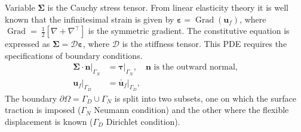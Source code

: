 \documentclass{svjour3}                     %
\DeclareMathOperator*{\Grad}{Grad}
\newcommand{\secondRev}[1]{\textcolor{blue!80!black}{#1}}
\begin{document}
\begin{itemize}
	Variable $\bm\Sigma$ is the Cauchy stress tensor. From linear elasticity theory it is well known that the infinitesimal \secondRev{strain} is given by $\bm\varepsilon = \Grad(\bm{u}_f)$, where $\Grad=~\frac{1}{2}[\nabla+\nabla^\top]$ is the symmetric gradient. The constitutive equation is expressed as $\bm\Sigma =  \bm{\mathcal{D}} \bm\varepsilon$, where $ \bm{\mathcal{D}}$ is the stiffness tensor. This PDE requires the specifications of boundary conditions.
	\begin{equation}
	\label{eq:bcPDE}
	\begin{aligned}
	\bm\Sigma \cdot \bm{n}|_{\Gamma_N} &= \bm\tau|_{\Gamma_N}, \quad \text{$\bm{n}$ is the outward normal,} \\
	\bm{u}_f|_{\Gamma_D} &= \bm{\bar{u}}_f|_{\Gamma_D},
	\end{aligned}
	\end{equation}
	The boundary $\partial \Omega = \Gamma_D \cup \Gamma_N$ is split into two subsets, one on which the surface traction is imposed ($\Gamma_N$ Neumann condition) and the other where the flexible displacement is known ($\Gamma_D$ Dirichlet condition). 
\end{itemize}
\end{document}
